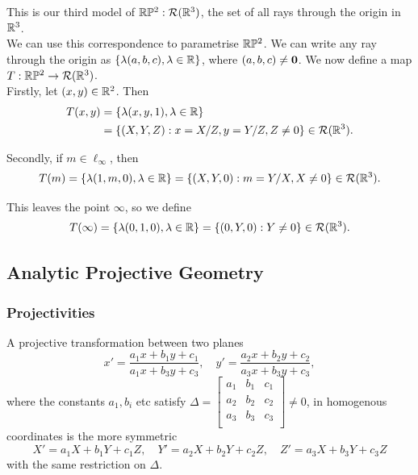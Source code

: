 This is our third model of \(\mathbb{R}\mathbb{P}^2: \mathcal{R}(\mathbb{R}^3)\), the set of all rays through the origin in \(\mathbb{R}^3\). \\

We can use this correspondence to parametrise \(\mathbb{R}\mathbb{P}^2\). We can write any ray through the origin as \(\{\lambda(a, b, c), \lambda \in \mathbb{R}\}\), where \((a, b, c) \neq \mathbf{0}\). We now define a map \(T: \mathbb{R}\mathbb{P}^2 \to \mathcal{R}(\mathbb{R}^3)\). \\

Firstly, let \((x, y) \in \mathbb{R}^2\). Then
\begin{align*}
    T(x, y) & = \{\lambda(x, y, 1), \lambda \in \mathbb{R}\}                                 \\
            & = \{(X, Y, Z) : x = X / Z, y = Y/Z, Z \neq 0 \} \in \mathcal{R}(\mathbb{R}^3).
\end{align*}

Secondly, if \(m \in \ell_\infty\), then
\[T(m) = \{\lambda(1, m, 0), \lambda \in \mathbb{R}\} = \{(X, Y, 0): m = Y / X, X \neq 0\}  \in \mathcal{R}(\mathbb{R}^3).\]

This leaves the point \(\infty\), so we define
\[T(\infty) = \{\lambda(0, 1, 0), \lambda \in \mathbb{R}\} = \{(0, Y, 0) : Y \neq 0\} \in \mathcal{R}(\mathbb{R}^3).\]


\subsection{Analytic Projective Geometry}

\subsubsection{Projectivities}

A projective transformation between two planes
\[x' = \frac{a_1 x + b_1 y + c_1}{a_1 x + b_3 y + c_3}, \quad y' = \frac{a_2 x + b_2 y + c_2}{a_3 x + b_3 y + c_3},\]
where the constants \(a_1, b_i\) etc satisfy \(\Delta = \begin{bmatrix}
    a_1 & b_1 & c_1 \\
    a_2 & b_2 & c_2 \\
    a_3 & b_3 & c_3 \\
\end{bmatrix} \neq 0\), in homogenous coordinates is the more symmetric
\[X' = a_1 X + b_1 Y + c_1 Z, \quad Y' = a_2 X + b_2 Y + c_2 Z, \quad Z' = a_3 X + b_3 Y + c_3 Z\]
with the same restriction on \(\Delta\).

